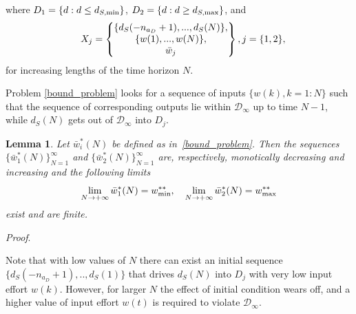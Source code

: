 \documentclass[letterpaper, 10 pt, conference]{ieeeconf}  %
\newtheorem{lemma}{Lemma}
\newcommand{\AB}[1]{\textbf{\color{magenta}{[AB: #1]}}}
\begin{document}
	\normalsize
where $D_1 = \{d:d \leq d_{S,{\rm min}}\}$, $D_2 = \{d:d \geq d_{S,{\rm max}}\}$,
and
\begin{equation*}
\small 
X_j = 
	\begin{Bmatrix}
	\{d_S(-n_{a_D}+1),...,d_S(N)\},\\
	\{w(1),...,w(N)\},\vspace{0.001cm}\\
	\bar{w}_j
	\end{Bmatrix}, j=\{1,2\},
	\begin{matrix} 
	\end{matrix}
\end{equation*}
\normalsize
for increasing lengths of the time horizon $N$.

Problem \eqref{bound_problem} looks for a sequence of inputs $\{w(k), k={1:N}\}$ such that the sequence of corresponding outputs lie within $\mathcal{D}_{\infty}$
up to time $N-1$, while $d_S(N)$ gets out of $\mathcal{D}_{\infty}$ into $D_j$. 
\begin{lemma}
Let $\bar w_i^*(N)$ be defined as in~\eqref{bound_problem}. Then
the sequences $\{\bar w_1^*(N)\}_{N=1}^{\infty}$ and
$\{\bar w_2^*(N)\}_{N=1}^{\infty}$ are, respectively,
monotically decreasing and increasing and the following limits 
\[
    \lim_{N\rightarrow+\infty}\bar w_1^*(N)=w^{**}_{\rm min},\quad    \lim_{N\rightarrow+\infty}\bar w_2^*(N)=w^{**}_{\rm max}
\]
exist and are finite.
\end{lemma}
\emph{Proof}.
\AB{TBC}
\hfill\QED

Note that with low values of $N$ there can exist an initial sequence $\{d_S(-n_{a_D}+1),..,d_S(1)\}$ that drives $d_S(N)$ into $D_j$ with very low input effort $w(k)$. However, for larger $N$ the effect of initial condition wears off, and a higher value of input effort $w(t)$ is required to violate $\mathcal{D}_{\infty}$. 
\end{document}
